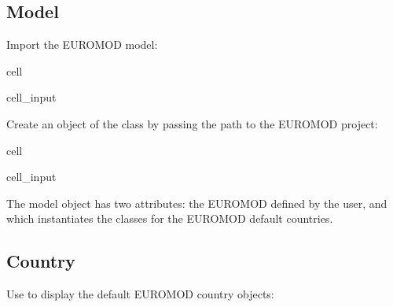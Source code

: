 \documentclass[letterpaper,10pt,english]{sphinxmanual}
\begin{document}
\subsection{Model}
\label{\detokenize{userguide:model}}
\sphinxAtStartPar
Import the EUROMOD model:

\begin{sphinxuseclass}{cell}
\begin{sphinxuseclass}{cell_input}
\begin{sphinxVerbatim}[commandchars=\\\{\}]
   
\end{sphinxVerbatim}

\end{sphinxuseclass}
\end{sphinxuseclass}
\sphinxAtStartPar
Create an object of the  class by passing the path to the  EUROMOD project:

\begin{sphinxuseclass}{cell}
\begin{sphinxuseclass}{cell_input}
\begin{sphinxVerbatim}[commandchars=\\\{\}]
  
\end{sphinxVerbatim}

\end{sphinxuseclass}
\end{sphinxuseclass}
\sphinxAtStartPar
The model object  has two attributes: the EUROMOD  defined by the user, and  which instantiates the  classes for the EUROMOD default countries.


\subsection{Country}
\label{\detokenize{userguide:country}}
\sphinxAtStartPar
Use  to display the default EUROMOD country objects:
\end{document}
